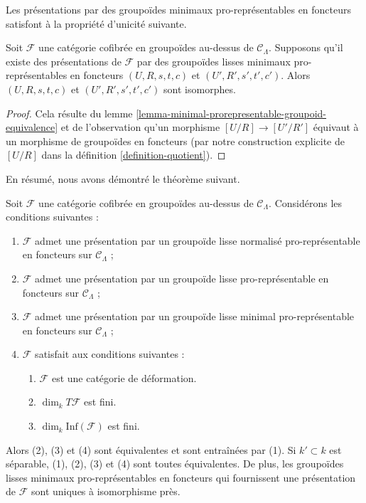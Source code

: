 \noindent
Les présentations par des groupoïdes minimaux pro-représentables en foncteurs
satisfont à la propriété d'unicité suivante.

\begin{lemma}
\label{lemma-minimal-presentations-equivalent}
Soit $\mathcal{F}$ une catégorie cofibrée en groupoïdes au-dessus de
$\mathcal{C}_\Lambda$. Supposons qu'il existe des présentations de
$\mathcal{F}$ par des groupoïdes lisses minimaux pro-représentables en
foncteurs $(U, R, s, t, c)$ et $(U', R', s', t', c')$. Alors
$(U, R, s, t, c)$ et $(U', R', s', t', c')$ sont isomorphes.
\end{lemma}

\begin{proof}
Cela résulte du lemme
\ref{lemma-minimal-prorepresentable-groupoid-equivalence} et de l'observation
qu'un morphisme $[U/R] \to [U'/R']$ équivaut à un morphisme de groupoïdes en
foncteurs (par notre construction explicite de $[U/R]$ dans la définition
\ref{definition-quotient}).
\end{proof}

\noindent
En résumé, nous avons démontré le théorème suivant.

\begin{theorem}
\label{theorem-minimal-smooth-prorepresentable-presentations}
Soit $\mathcal{F}$ une catégorie cofibrée en groupoïdes au-dessus de
$\mathcal{C}_\Lambda$. Considérons les conditions suivantes :
\begin{enumerate}
\item $\mathcal{F}$ admet une présentation par un groupoïde lisse normalisé
pro-représentable en foncteurs sur $\mathcal{C}_\Lambda$ ;
\item $\mathcal{F}$ admet une présentation par un groupoïde lisse
pro-représentable en foncteurs sur $\mathcal{C}_\Lambda$ ;
\item $\mathcal{F}$ admet une présentation par un groupoïde lisse minimal
pro-représentable en foncteurs sur $\mathcal{C}_\Lambda$ ;
\item $\mathcal{F}$ satisfait aux conditions suivantes :
\begin{enumerate}
\item $\mathcal{F}$ est une catégorie de déformation.
\item $\dim_k T\mathcal{F}$ est fini.
\item $\dim_k \text{Inf}(\mathcal{F})$ est fini.
\end{enumerate}
\end{enumerate}
Alors (2), (3) et (4) sont équivalentes et sont entraînées par (1). Si
$k' \subset k$ est séparable, (1), (2), (3) et (4) sont toutes équivalentes.
De plus, les groupoïdes lisses minimaux pro-représentables en foncteurs qui
fournissent une présentation de $\mathcal{F}$ sont uniques à isomorphisme près.
\end{theorem}

